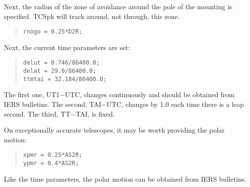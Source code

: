\documentclass[12pt,fleqn,twoside]{article}
\renewcommand{\_}{{\tt\char'137}}     %
\begin{document}
Next, the radius of the zone of avoidance around the pole of
the mounting is specified.  TCSpk will track around, not through,
this zone.
\begin{quote}
\begin{small}
\begin{verbatim}
rnogo = 0.25*D2R;
\end{verbatim}\end{small}
\end{quote}
Next, the current time parameters are set:
\begin{quote}
\begin{small}
\begin{verbatim}
delut = 0.746/86400.0;
delat = 29.0/86400.0;
ttmtai = 32.184/86400.0;
\end{verbatim}\end{small}
\end{quote}
The first one, UT1$-$UTC, changes continuously and should be obtained
from IERS bulletins.  The second, TAI$-$UTC, changes by 1.0 each time
there is a leap second.  The third, TT$-$TAI, is fixed.

On exceptionally accurate telescopes, it may be worth providing the
polar motion:
\begin{quote}
\begin{small}
\begin{verbatim}
xpmr = 0.25*AS2R;
ypmr = 0.4*AS2R;
\end{verbatim}\end{small}
\end{quote}
Like the time parameters, the polar motion can be obtained from
IERS bulletins.
\end{document}
